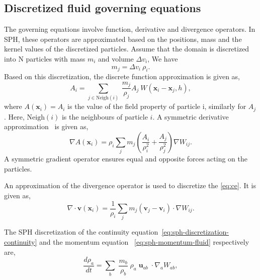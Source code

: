 \documentclass[preprint,12pt]{elsarticle}
\newcommand{\ten}[1]{\ensuremath{\mathbf{#1}}}
\begin{document}
\FloatBarrier%
\subsection{Discretized fluid governing equations}
\label{sec:sph--governing-equations}
The governing equations involve function, derivative and divergence
operators. In SPH, these operators are approximated based on the positions,
mass and the kernel values of the discretized particles. Assume that the
domain is discretized into N particles with mass $m_i$ and volume
$\Delta v_i$, We have
\begin{equation}
  \label{eq:mass_repr}
  m_j = \Delta v_i \> \rho_i.
\end{equation}
Based on this discretization, the discrete function approximation is given as,
\begin{equation}
  \label{eq:discrete_form}
  A_i = \sum_{j \in \text{Neigh}(i)}\> \frac{m_j}{\rho_j} A_j\> W(\ten{x}_i - \ten{x}_j, h),
\end{equation}
where $A(\boldsymbol{x}_i) = A_i$ is the value of the field property of
particle i, similarly for $A_j$. Here, $\text{Neigh}(i)$ is the neighbours of
particle $i$.  A symmetric derivative approximation~\cite{Violeau16} is given
as,
\begin{equation}
  \nabla A(\ten{x}_i) = \rho_i \sum_{j} m_j \left(\frac{A_i}{\rho_i^2} + \frac{A_j}{\rho_j^2}\right) \nabla W_{ij}.
\end{equation}
A symmetric gradient operator ensures equal and opposite forces acting on the
particles.


An approximation of the divergence operator is used to discretize the
\cref{eq:ce}.  It is given as,
\begin{equation}
  \label{intro:eq:sph-continu-div-final}
  \nabla \cdot \ten{v}(\ten{x}_i) = \frac{1}{\rho_i} \sum_{j} m_j \left(\ten{v}_j - \ten{v}_i\right) \cdot \nabla W_{ij}.
\end{equation}


The SPH discretization of the continuity
equation~\cref{eq:sph-discretization-continuity} and the momentum equation
~\cref{eq:sph-momentum-fluid} respectively are,
\begin{equation}
  \label{eq:sph-discretization-continuity}
  \frac{{d}\rho_a}{dt} = \sum_{b} \; \frac{m_b}{\rho_{b}} \;
  \rho_{a} \; {\ten{u}}_{ab} \; \cdot \nabla_{a} W_{ab},
\end{equation}
\end{document}
